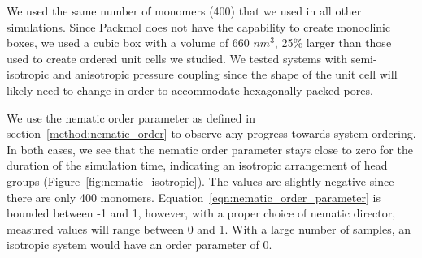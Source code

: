 \documentclass{article}
\begin{document}
  We used the same number of monomers (400) that we used in all other simulations. 
  Since Packmol does not have the capability to create monoclinic boxes, we used a cubic
  box with a volume of 660 $nm^3$, 25\% larger than those used to create ordered unit
  cells we studied. We tested systems with semi-isotropic and anisotropic pressure 
  coupling since the shape of the unit cell will likely need to change in order to 
  accommodate hexagonally packed pores.
  
  We use the nematic order parameter as defined in section~\ref{method:nematic_order} to 
  observe any progress towards system ordering. In both cases, we see that the nematic
  order parameter stays close to zero for the duration of the simulation time, indicating
  an isotropic arrangement of head groups (Figure~\ref{fig:nematic_isotropic}). The values
  are slightly negative since there are only 400 monomers. 
  Equation~\ref{eqn:nematic_order_parameter} is bounded between -1 and 1, however, with a
  proper choice of nematic director, measured values will range between 0 and 1. With a 
  large number of samples, an isotropic system would have an order parameter of 0.
  
\end{document}
